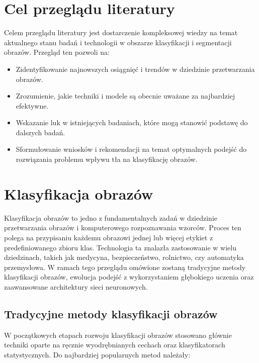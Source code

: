 \section*{Cel przeglądu literatury}
Celem przeglądu literatury jest dostarczenie kompleksowej wiedzy na temat aktualnego stanu badań
i technologii w obszarze klasyfikacji i segmentacji obrazów. Przegląd ten pozwoli na:

\begin{itemize}
    \item Zidentyfikowanie najnowszych osiągnięć i trendów w dziedzinie przetwarzania obrazów.
    \item Zrozumienie, jakie techniki i modele są obecnie uważane za najbardziej efektywne.
    \item Wskazanie luk w istniejących badaniach, które mogą stanowić podstawę do dalszych badań.
    \item Sformułowanie wniosków i rekomendacji na temat optymalnych podejść do rozwiązania problemu wpływu tła na klasyfikację obrazów.
\end{itemize}

\section*{Klasyfikacja obrazów}

Klasyfikacja obrazów to jedno z fundamentalnych zadań w dziedzinie przetwarzania obrazów i 
komputerowego rozpoznawania wzorców. Proces ten polega na przypisaniu każdemu obrazowi jednej 
lub więcej etykiet z predefiniowanego zbioru klas. Technologia ta znalazła zastosowanie w wielu 
dziedzinach, takich jak medycyna, bezpieczeństwo, rolnictwo, czy automatyka przemysłowa. W ramach 
tego przeglądu omówione zostaną tradycyjne metody klasyfikacji obrazów, ewolucja podejść z 
wykorzystaniem głębokiego uczenia oraz zaawansowane architektury sieci neuronowych.

\subsection*{Tradycyjne metody klasyfikacji obrazów}

W początkowych etapach rozwoju klasyfikacji obrazów stosowano głównie techniki oparte
na ręcznie wyodrębnianych cechach oraz klasyfikatorach statystycznych. Do najbardziej
popularnych metod należały:

